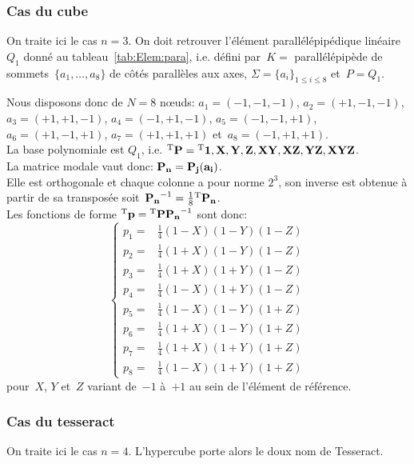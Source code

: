 \medskip
\subsubsection{Cas du cube}
On traite ici le cas $n=3$.
On doit retrouver l'élément parallélépipédique linéaire~$Q_1$ donné au tableau~\ref{tab:Elem:para}, i.e. défini par~$K =$ parallélépipède de sommets~$\{a_1,\ldots, a_8\}$ de côtés parallèles aux axes, $\Sigma = \{a_i\}_{1\le i\le8}$ et~$P=Q_1$.

\medskip
Nous disposons donc de $N=8$ nœuds: $a_1=(-1,-1,-1)$,  $a_2=(+1,-1,-1)$, $a_3=(+1,+1,-1)$, $a_4=(-1,+1,-1)$,
$a_5=(-1,-1,+1)$,  $a_6=(+1,-1,+1)$, $a_7=(+1,+1,+1)$ et~$a_8=(-1,+1,+1)$.\\
La base polynomiale est $Q_1$, i.e. ${}^\mathrm{T}\mathbf{P}={}^\mathrm{T}\mathbf{1, X, Y, Z, XY, XZ, YZ, XYZ}$.\\
La matrice modale vaut donc:
$\MM{P_n}=\MM{P_j(a_i)}$.\\
Elle est orthogonale et chaque colonne a pour norme $2^3$, son inverse est obtenue à partir de sa transposée soit~$\MMI{P_n}=\frac18\MMT{P_n}$.\\
Les fonctions de forme $\LL{p}=\LL{P}\MMI{P_n}$ sont donc:
\begin{equation}
\left\{
\begin{array}{lr}
p_1= & \frac14(1-X)(1-Y)(1-Z)\\
p_2= & \frac14(1+X)(1-Y)(1-Z)\\
p_3= & \frac14(1+X)(1+Y)(1-Z)\\
p_4= & \frac14(1-X)(1+Y)(1-Z)\\
p_5= & \frac14(1-X)(1-Y)(1+Z)\\
p_6= & \frac14(1+X)(1-Y)(1+Z)\\
p_7= & \frac14(1+X)(1+Y)(1+Z)\\
p_8= & \frac14(1-X)(1+Y)(1+Z)
\end{array}
\right.
\end{equation}
pour~$X$, $Y$ et~$Z$ variant de~$-1$ à~$+1$ au sein de l'élément de référence.


\medskip
\subsubsection{Cas du tesseract}

On traite ici le cas $n=4$. L'hypercube porte alors le doux nom de Tesseract.


